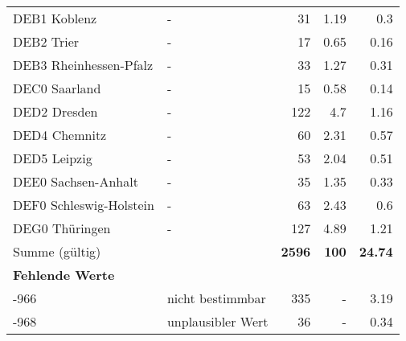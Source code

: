 \begin{longtable}{Xlrrr}
        \multicolumn{1}{X}{DEB1 Koblenz} & - & \num{31} & \num[round-mode=places,round-precision=2]{1.19} & \num[round-mode=places,round-precision=2]{0.3} \\
        \multicolumn{1}{X}{DEB2 Trier} & - & \num{17} & \num[round-mode=places,round-precision=2]{0.65} & \num[round-mode=places,round-precision=2]{0.16} \\
        \multicolumn{1}{X}{DEB3 Rheinhessen-Pfalz} & - & \num{33} & \num[round-mode=places,round-precision=2]{1.27} & \num[round-mode=places,round-precision=2]{0.31} \\
        \multicolumn{1}{X}{DEC0 Saarland} & - & \num{15} & \num[round-mode=places,round-precision=2]{0.58} & \num[round-mode=places,round-precision=2]{0.14} \\
        \multicolumn{1}{X}{DED2 Dresden} & - & \num{122} & \num[round-mode=places,round-precision=2]{4.7} & \num[round-mode=places,round-precision=2]{1.16} \\
        \multicolumn{1}{X}{DED4 Chemnitz} & - & \num{60} & \num[round-mode=places,round-precision=2]{2.31} & \num[round-mode=places,round-precision=2]{0.57} \\
        \multicolumn{1}{X}{DED5 Leipzig} & - & \num{53} & \num[round-mode=places,round-precision=2]{2.04} & \num[round-mode=places,round-precision=2]{0.51} \\
        \multicolumn{1}{X}{DEE0 Sachsen-Anhalt} & - & \num{35} & \num[round-mode=places,round-precision=2]{1.35} & \num[round-mode=places,round-precision=2]{0.33} \\
        \multicolumn{1}{X}{DEF0 Schleswig-Holstein} & - & \num{63} & \num[round-mode=places,round-precision=2]{2.43} & \num[round-mode=places,round-precision=2]{0.6} \\
        \multicolumn{1}{X}{DEG0 Thüringen} & - & \num{127} & \num[round-mode=places,round-precision=2]{4.89} & \num[round-mode=places,round-precision=2]{1.21} \\
     \midrule
      \multicolumn{2}{l}{Summe (gültig)} & \textbf{\num{2596}} &
      \textbf{\num{100}} &
         \textbf{\num[round-mode=places,round-precision=2]{24.74}} \\
     \multicolumn{5}{l}{\textbf{Fehlende Werte}}\\
       -966 & nicht bestimmbar & \num{335} & - & \num[round-mode=places,round-precision=2]{3.19} \\

       -968 & unplausibler Wert & \num{36} & - & \num[round-mode=places,round-precision=2]{0.34} \\


\end{longtable}
